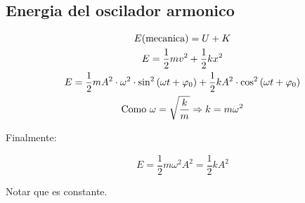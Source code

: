 \subsection{Energia del oscilador armonico}
\begin{gather}
	\nonumber E(\text{mecanica}) = U + K \\
	\nonumber E = \frac{1}{2} m v^2 + \frac{1}{2} k x^2 \\
	\nonumber E = \frac{1}{2} m A^2 \cdot \omega^2 \cdot \sin^2{(\omega t + \varphi_0)} + \frac{1}{2} k A^2 \cdot \cos^2{(\omega t + \varphi_0)}\\
	\nonumber\text{Como } \omega=\sqrt{\frac{k}{m}} \Rightarrow k=m \omega^2
\end{gather}

Finalmente:

\[
	E=\frac{1}{2} m \omega^2 A^2 = \frac{1}{2} k A^2 
\]

Notar que es constante.



